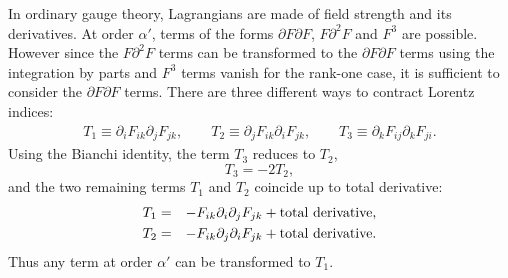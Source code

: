 \documentclass[a4paper,12pt]{article}
\begin{document}
In ordinary gauge theory, Lagrangians are made of
field strength and its derivatives.
At order $\alpha'$,
terms of the forms $\partial F \partial F$,
$F \partial^2 F$ and $F^3$ are possible.
However since the $F \partial^2 F$ terms can be transformed
to the $\partial F \partial F$ terms
using the integration by parts
and $F^3$ terms vanish for the rank-one case,
it is sufficient to consider the $\partial F \partial F$ terms.
There are three different ways to contract Lorentz indices:
\begin{eqnarray}
T_1 \equiv \partial_i F_{ik} \partial_j F_{jk}, \qquad
T_2 \equiv \partial_j F_{ik} \partial_i F_{jk}, \qquad
T_3 \equiv \partial_k F_{ij} \partial_k F_{ji}.
\end{eqnarray}
Using the Bianchi identity, the term $T_3$ reduces to $T_2$,
\begin{equation}
T_3 = -2 T_2,
\end{equation}
and the two remaining terms $T_1$ and $T_2$
coincide up to total derivative:
\begin{eqnarray}
T_1 &=& - F_{ik} \partial_i \partial_j F_{jk}
+ {\rm total~derivative}, \\
T_2 &=& - F_{ik} \partial_j \partial_i F_{jk}
+ {\rm total~derivative}.
\end{eqnarray}
Thus any term at order $\alpha'$
can be transformed to $T_1$.
\end{document}
